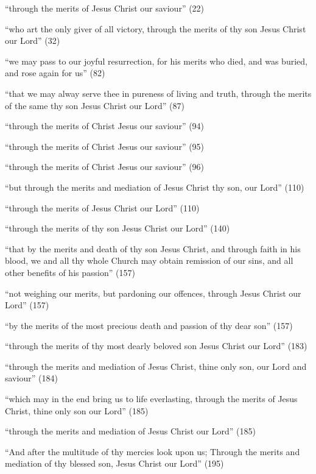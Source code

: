 			\begin{compactitem}
				\item ``through the merits of Jesus Christ our saviour'' (22)
				\item ``who art the only giver of all victory, through the merits of thy son Jesus Christ our Lord'' (32)
				\item ``we may pass to our joyful resurrection, for his merits who died, and was buried, and rose again for us'' (82)
				\item ``that we may alway serve thee in pureness of living and truth, through the merits of the same thy son Jesus Christ our Lord'' (87)
				\item ``through the merits of Christ Jesus our saviour'' (94)
				\item ``through the merits of Christ Jesus our saviour'' (95)
				\item ``through the merits of Christ Jesus our saviour'' (96)
				\item ``but through the merits and mediation of Jesus Christ thy son, our Lord'' (110)
				\item ``through the merits of Jesus Christ our Lord'' (110)
				\item ``through the merits of thy son Jesus Christ our Lord'' (140)
				\item ``that by the merits and death of thy son Jesus Christ, and through faith in his blood, we and all thy whole Church may obtain remission of our sins, and all other benefits of his passion'' (157)
				\item ``not weighing our merits, but pardoning our offences, through Jesus Christ our Lord'' (157)
				\item ``by the merits of the most precious death and passion of thy dear son'' (157)
				\item ``through the merits of thy most dearly beloved son Jesus Christ our Lord'' (183)
				\item ``through the merits and mediation of Jesus Christ, thine only son, our Lord and saviour'' (184)
				\item ``which may in the end bring us to life everlasting, through the merits of Jesus Christ, thine only son our Lord'' (185)
				\item ``through the merits and mediation of Jesus Christ our Lord'' (185)
				\item ``And after the multitude of thy mercies look upon us; Through the merits and mediation of thy blessed son, Jesus Christ our Lord'' (195)

\end{compactitem}
